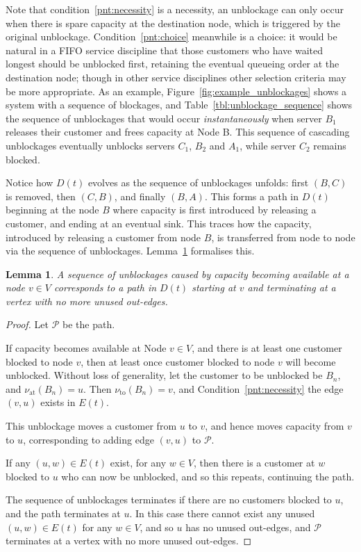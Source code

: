 \documentclass{article}
\newtheorem{lemma}{Lemma}
\begin{document}
Note that condition~\ref{pnt:necessity} is a necessity, an unblockage can only
occur when there is spare capacity at the destination node, which is triggered
by the original unblockage.
Condition~\ref{pnt:choice} meanwhile is a choice: it would be natural in a FIFO
service discipline that those customers who have waited longest should be
unblocked first, retaining the eventual queueing order at the destination node;
though in other service disciplines other selection criteria may be more
appropriate.
As an example, Figure~\ref{fig:example_unblockages} shows a system with a
sequence of blockages, and Table~\ref{tbl:unblockage_sequence} shows the
sequence of unblockages that would occur \textit{instantaneously} when server
$B_1$ releases their customer and frees capacity at Node B.
This sequence of cascading unblockages eventually unblocks servers $C_1$, $B_2$
and $A_1$, while server $C_2$ remains blocked.

Notice how $D(t)$ evolves as the sequence of unblockages unfolds: first $(B, C)$
is removed, then $(C, B)$, and finally $(B, A)$.
This forms a path in $D(t)$ beginning at the node $B$ where capacity is first
introduced by releasing a customer, and ending at an eventual sink.
This traces how the capacity, introduced by releasing a customer from node $B$,
is transferred from node to node via the sequence of unblockages.
Lemma~\ref{thrm:graph_traversal} formalises this.

\begin{lemma}\label{thrm:graph_traversal}
A sequence of unblockages caused by capacity becoming available at a node
$v \in V$ corresponds to a path in $D(t)$ starting at $v$ and terminating at a
vertex with no more unused out-edges.
\end{lemma}

\begin{proof}
Let $\mathcal{P}$ be the path.

If capacity becomes available at Node $v \in V$, and there is at least one
customer blocked to node $v$, then at least once customer blocked to node $v$
will become unblocked.
Without loss of generality, let the customer to be unblocked be $B_n$, and
$\nu_{\text{at}}(B_n) = u$.
Then $\nu_{\text{to}}(B_n) = v$, and Condition~\ref{pnt:necessity} the edge
$(v, u)$ exists in $E(t)$.

This unblockage moves a customer from $u$ to $v$, and hence moves capacity from
$v$ to $u$, corresponding to adding edge $(v, u)$ to $\mathcal{P}$.

If any $(u, w) \in E(t)$ exist, for any $w \in V$, then there is a customer at
$w$ blocked to $u$ who can now be unblocked, and so this repeats, continuing the
path.

The sequence of unblockages terminates if there are no customers blocked to $u$,
and the path terminates at $u$.
In this case there cannot exist any unused $(u, w) \in E(t)$ for any $w \in V$,
and so $u$ has no unused out-edges, and $\mathcal{P}$ terminates at a vertex
with no more unused out-edges.
\end{proof}
\end{document}
